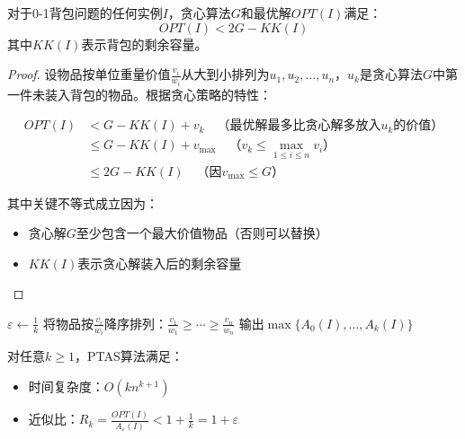 \documentclass[./../main.tex]{subfiles} %
\begin{document}
\begin{theorem}
对于0-1背包问题的任何实例$I$，贪心算法$G$和最优解$OPT(I)$满足：
$$ OPT(I) < 2G - KK(I) $$
其中$KK(I)$表示背包的剩余容量。
\end{theorem}

\begin{proof}
设物品按单位重量价值$\frac{v_i}{w_i}$从大到小排列为$u_1,u_2,\ldots,u_n$，$u_k$是贪心算法$G$中第一件未装入背包的物品。根据贪心策略的特性：

\begin{align*}
OPT(I) &< G - KK(I) + v_k \quad \text{（最优解最多比贪心解多放入$u_k$的价值）} \\
&\leq G - KK(I) + v_{\max} \quad \text{（$v_k \leq \max\limits_{1\leq i\leq n} v_i$）} \\
&\leq 2G - KK(I) \quad \text{（因$v_{\max} \leq G$）}
\end{align*}

其中关键不等式成立因为：
\begin{itemize}
\item 贪心解$G$至少包含一个最大价值物品（否则可以替换）
\item $KK(I)$表示贪心解装入后的剩余容量
\end{itemize}
\end{proof}

\begin{algorithm}[H]
\caption{PTAS算法}
\SetAlgoLined
{}
$\varepsilon \leftarrow \frac{1}{k}$\;
将物品按$\frac{v_i}{w_i}$降序排列：$\frac{v_1}{w_1} \geq \cdots \geq \frac{v_n}{w_n}$\;
输出$\max\{A_0(I),\ldots,A_k(I)\}$\;
\end{algorithm}

\begin{theorem}
对任意$k \geq 1$，PTAS算法满足：
\begin{itemize}
\item 时间复杂度：$O(kn^{k+1})$
\item 近似比：$R_k = \frac{OPT(I)}{A_\varepsilon(I)} < 1 + \frac{1}{k} = 1 + \varepsilon$
\end{itemize}
\end{theorem}
\end{document}

